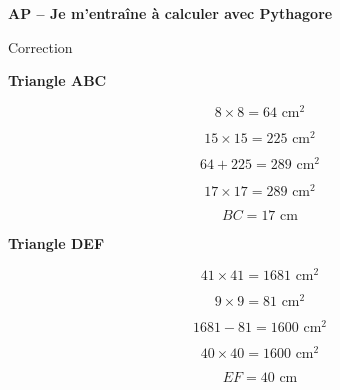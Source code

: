 \documentclass[11pt,a4paper,landscape]{article}
\begin{document}

\begin{center}
{\sffamily\LARGE\bfseries\color{TitreC}
AP -- Je m'entraîne à calculer avec Pythagore}

\vspace{0.1cm}

{\sffamily\large\color{SavoirC}
Correction}
\end{center}

\vspace{0.3cm}


\noindent
\begin{minipage}[t]{0.235\textwidth}

\begin{tcolorbox}[
  colback=white,
  colframe=ActionC!50,
  boxrule=0.6pt,
  arc=1.5mm,
  height=7cm
]

\begin{center}
{\sffamily\bfseries\color{ActionC}Triangle ABC}
\end{center}

\[
8\times8=64\text{ cm}^2
\]

\[
15\times15=225\text{ cm}^2
\]

\[
64+225=289\text{ cm}^2
\]

\[
17\times17=289\text{ cm}^2
\]

\[
\boxed{BC=17\text{ cm}}
\]

\end{tcolorbox}

\end{minipage}
\hfill
%
\begin{minipage}[t]{0.235\textwidth}

\begin{tcolorbox}[
  colback=white,
  colframe=ActionC!50,
  boxrule=0.6pt,
  arc=1.5mm,
  height=7cm
]

\begin{center}
{\sffamily\bfseries\color{ActionC}Triangle DEF}
\end{center}

\[
41\times41=1681\text{ cm}^2
\]

\[
9\times9=81\text{ cm}^2
\]

\[
1681-81=1600\text{ cm}^2
\]

\[
40\times40=1600\text{ cm}^2
\]

\[
\boxed{EF=40\text{ cm}}
\]

\end{tcolorbox}

\end{minipage}
\end{document}
